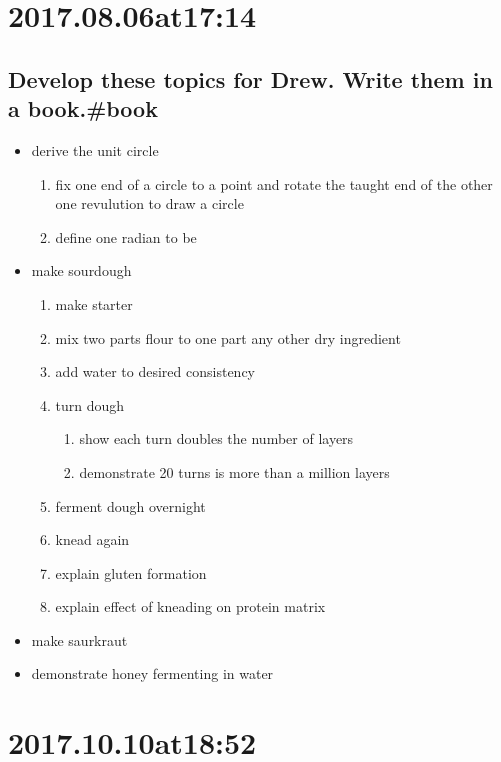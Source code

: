 \section*{ 2017.08.06at17:14 }
\subsection*{ Develop these topics for Drew. Write them in a book.\#book}
\begin{itemize}
    \item derive the unit circle \begin{enumerate}
        \item fix one end of a circle to a point and rotate the taught end of the other one revulution to draw a circle
        \item define one radian to be 
    \end{enumerate}
    \item make sourdough
    \begin{enumerate}
        \item make starter
        \item mix two parts flour to one part any other dry ingredient
        \item add water to desired consistency
        \item turn dough
        \begin{enumerate}
            \item show each turn doubles the number of layers
            \item demonstrate 20 turns is more than a million layers
        \end{enumerate}
        \item ferment dough overnight
        \item knead again
        \item explain gluten formation
        \item explain effect of kneading on protein matrix
    \end{enumerate}
    \item make saurkraut
    \item demonstrate honey fermenting in water
\end{itemize}

\section*{ 2017.10.10at18:52 }
